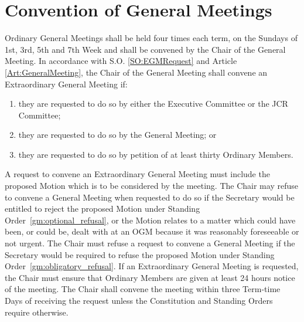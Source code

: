 \section{Convention of General Meetings}
\npara Ordinary General Meetings shall be held four times each term, on the Sundays of 1st, 3rd, 5th and 7th Week and shall be convened by the Chair of the General Meeting.
\npara In accordance with S.O. \ref{SO:EGMRequest} and Article \ref{Art:GeneralMeeting}, the Chair of the General Meeting shall convene an Extraordinary General Meeting if:
\begin{enumerate}
\item they are requested to do so by either the Executive Committee or the JCR Committee;
\item they are requested to do so by the General Meeting; or
\item they are requested to do so by petition of at least thirty Ordinary Members.
\end{enumerate}
\npara \label{SO:EGMRequest} A request to convene an Extraordinary General Meeting must include the proposed Motion which is to be considered by the meeting.  The Chair may refuse to convene a General Meeting when requested to do so if the Secretary would be entitled to reject the proposed Motion under Standing Order~\ref{gm:optional_refusal}, or the Motion relates to a matter which could have been, or could be, dealt with at an OGM because it was reasonably foreseeable or not urgent. The Chair must refuse a request to convene a General Meeting if the Secretary would be required to refuse the proposed Motion under Standing Order~\ref{gm:obligatory_refusal}.
\npara If an Extraordinary General Meeting is requested, the Chair must ensure that Ordinary Members are given at least 24 hours notice of the meeting.  The Chair shall convene the meeting within three Term-time Days of receiving the request unless the Constitution and Standing Orders require otherwise.
